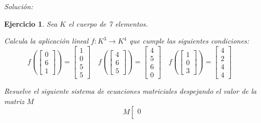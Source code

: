 \documentclass[12pt]{amsart}
\newtheorem{ejer}{Ejercicio}
\begin{document}
{\it Soluci\'on:}



\begin{ejer} Sea $K$ el cuerpo de 7 elementos.
\newline
\noindent\begin{minipage}{\textwidth}
\begin{tcolorbox}[colback = green!20!white,title=Versión Aplicación]
Calcula la aplicaci\'on lineal $f:K^{3} \to K^{4}$ que cumple las siguientes condiciones: 
\[f\left(\left[\begin{array}{r}
0 \\
6 \\
1
\end{array}\right]\right) = \left[\begin{array}{r}
1 \\
0 \\
5 \\
5
\end{array}\right] \quad f\left(\left[\begin{array}{r}
4 \\
6 \\
5
\end{array}\right]\right) = \left[\begin{array}{r}
4 \\
5 \\
6 \\
0
\end{array}\right] \quad f\left(\left[\begin{array}{r}
1 \\
0 \\
3
\end{array}\right]\right) = \left[\begin{array}{r}
4 \\
2 \\
4 \\
4
\end{array}\right] \quad 
\]\end{tcolorbox}
\end{minipage} \newline
\noindent\begin{minipage}{\textwidth}
\begin{tcolorbox}[colback = blue!20!white,title=Versión Sistema Matricial]
Resuelve el siguiente sistema de ecuaciones matriciales despejando el valor de la matriz $M$
\[M \left[\begin{array}{r}
0 \\

\end{array}\]
\end{tcolorbox}
\end{minipage}
\end{ejer}
\end{document}

